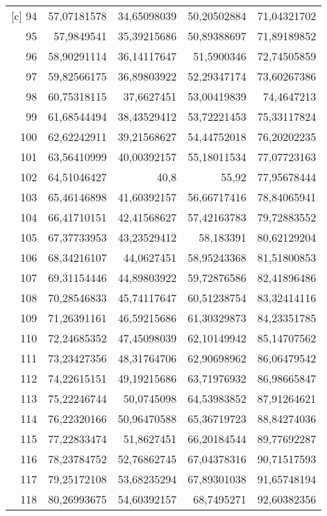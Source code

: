 \begin{longtable}{r|rrrr}[c]
    94    & 57,07181578 & 34,65098039 & 50,20502884 & 71,04321702 \\
    95    & 57,9849541 & 35,39215686 & 50,89388697 & 71,89189852 \\
    96    & 58,90291114 & 36,14117647 & 51,5900346 & 72,74505859 \\
    97    & 59,82566175 & 36,89803922 & 52,29347174 & 73,60267386 \\
    98    & 60,75318115 & 37,6627451 & 53,00419839 & 74,4647213 \\
    99    & 61,68544494 & 38,43529412 & 53,72221453 & 75,33117824 \\
    100   & 62,62242911 & 39,21568627 & 54,44752018 & 76,20202235 \\
    101   & 63,56410999 & 40,00392157 & 55,18011534 & 77,07723163 \\
    102   & 64,51046427 & 40,8  & 55,92 & 77,95678444 \\
    103   & 65,46146898 & 41,60392157 & 56,66717416 & 78,84065941 \\
    104   & 66,41710151 & 42,41568627 & 57,42163783 & 79,72883552 \\
    105   & 67,37733953 & 43,23529412 & 58,183391 & 80,62129204 \\
    106   & 68,34216107 & 44,0627451 & 58,95243368 & 81,51800853 \\
    107   & 69,31154446 & 44,89803922 & 59,72876586 & 82,41896486 \\
    108   & 70,28546833 & 45,74117647 & 60,51238754 & 83,32414116 \\
    109   & 71,26391161 & 46,59215686 & 61,30329873 & 84,23351785 \\
    110   & 72,24685352 & 47,45098039 & 62,10149942 & 85,14707562 \\
    111   & 73,23427356 & 48,31764706 & 62,90698962 & 86,06479542 \\
    112   & 74,22615151 & 49,19215686 & 63,71976932 & 86,98665847 \\
    113   & 75,22246744 & 50,0745098 & 64,53983852 & 87,91264621 \\
    114   & 76,22320166 & 50,96470588 & 65,36719723 & 88,84274036 \\
    115   & 77,22833474 & 51,8627451 & 66,20184544 & 89,77692287 \\
    116   & 78,23784752 & 52,76862745 & 67,04378316 & 90,71517593 \\
    117   & 79,25172108 & 53,68235294 & 67,89301038 & 91,65748194 \\
    118   & 80,26993675 & 54,60392157 & 68,7495271 & 92,60382356 \\

\end{longtable}
